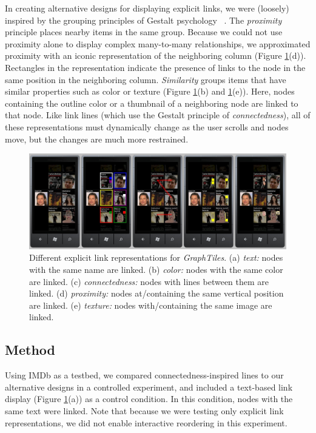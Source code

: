 \documentclass{sigchi}
\begin{document}
In creating alternative designs for displaying explicit links, we were (loosely) inspired by the grouping principles of Gestalt psychology ~\cite{RefWorks:562}. The \textit{proximity} principle places nearby items in the same group. Because we could not use proximity alone to display complex many-to-many relationships, we approximated proximity with an iconic representation of the neighboring column (Figure \ref{fig:linkrep}(d)). Rectangles in the representation indicate the presence of links to the node in the same position in the neighboring column. \textit{Similarity} groups items that have similar properties such as color or texture (Figure \ref{fig:linkrep}(b) and \ref{fig:linkrep}(e)). Here, nodes containing the outline color or a thumbnail of a neighboring node are linked to that node. Like link lines (which use the Gestalt principle of \textit{connectedness}), all of these representations must dynamically change as the user scrolls and nodes move, but the changes are much more restrained.

\begin{figure}[htb!]
\centering
\includegraphics[width=7in]{images/linkrep}
\caption{Different explicit link representations for \textit{GraphTiles}. (a) \emph{text:} nodes with the same name are linked. (b) \emph{color:} nodes with the same color are linked. (c) \emph{connectedness:} nodes with lines between them are linked. (d) \emph{proximity:} nodes at/containing the same vertical position are linked. (e) \emph{texture:} nodes with/containing the same image are linked.}
\label{fig:linkrep}
\end{figure}



\subsection{Method}

Using IMDb as a testbed, we compared connectedness-inspired lines to our alternative designs in a controlled experiment, and included a text-based link display (Figure \ref{fig:linkrep}(a)) as a control condition. In this condition, nodes with the same text were linked. Note that because we were testing only explicit link representations, we did not enable interactive reordering in this experiment.
\end{document}
